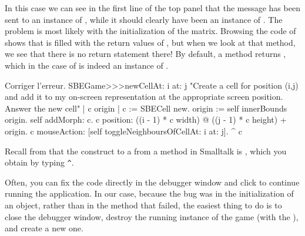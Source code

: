 \documentclass[a4paper,10pt,twoside]{book}
\begin{document}
In this case we can see in the first line of the top panel that the  message has been sent to an instance of , while it should clearly have been an instance of .
The problem is most likely with the initialization of the  matrix.
Browsing the code of  shows that  is filled with the return values of , but when we look at that method, we see that there is no return statement there!
By default, a method returns , which in the case of  is indeed an instance of .

\dothis{Fermer la fen\^etre du d\'ebogueur.
Ajouter l'expression ``\ct{^ c}'' à la fin de la méthode \ct{SBEGame>>>newCellAt:at:} de telle sorte quelle retourne \ct{c}.
(Voir \mthref{newCellAt:at:nobug}.)}

\begin{method}{Corriger l'erreur.}
SBEGame>>>newCellAt: i at: j
   "Create a cell for position (i,j) and add it to my on-screen
   representation at the appropriate screen position.  Answer the new cell"
   | c origin |
   c := SBECell new.
   origin := self innerBounds origin.
   self addMorph: c.
   c position: ((i - 1) * c width) @ ((j - 1) * c height) + origin.
   c mouseAction: [self toggleNeighboursOfCellAt: i at: j].
   ^ c
\end{method}

\noindent
Recall from  that the construct to  a  from a method in Smalltalk is \ct{^}, which you obtain by typing \verb|^|.

Often, you can fix the code directly in the debugger window and click  to continue running the application.
In our case, because the bug was in the initialization of an object, rather than in the method that failed, the easiest thing to do is to close the debugger window, destroy the running instance of the game (with the ), and create a new one.

\end{document}
